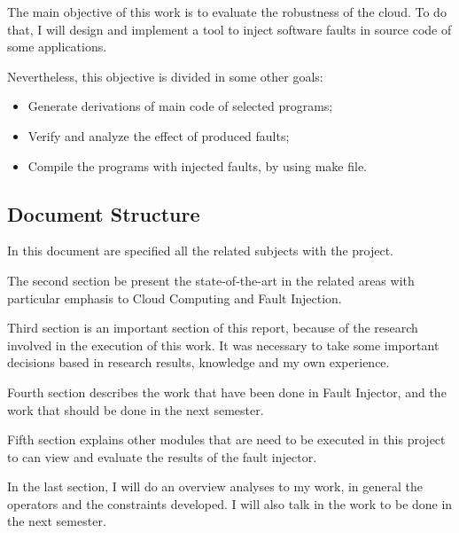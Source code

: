 The main objective of this work is to evaluate the robustness of the cloud. To do that, I will design and implement a tool to inject software faults in source code of some applications.

Nevertheless, this objective is divided in some other goals:

\begin{itemize}
	\item Generate derivations of main code of selected programs;
	\item Verify and analyze the effect of produced faults;
	\item Compile the programs with injected faults, by using make file.
\end{itemize}


\subsection{Document Structure}

In this document are specified all the related subjects with the project.

The second section be present the state-of-the-art in the related areas with particular emphasis to Cloud Computing and Fault Injection.

Third section is an important section of this report, because of the research involved in the execution of this work. It was necessary to take some important decisions based in research results, knowledge and my own experience.

Fourth section describes the work that have been done in Fault Injector, and the work that should be done in the next semester.

Fifth section explains other modules that are need to be executed in this project to can view and evaluate the results of the fault injector.

In the last section, I will do an overview analyses to my work, in general the operators and the constraints developed. I will also talk in the work to be done in the next semester.

